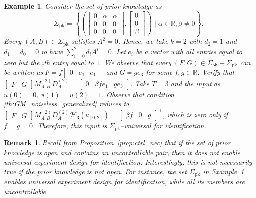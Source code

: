 \documentclass[journal,twoside,web]{ieeecolor}
\newcommand{\set}[2]{\left\{#1 \mid #2\right\}}
\newtheorem{example}[theorem]{Example}
\newtheorem{remark}[theorem]{Remark}
\begin{document}
\begin{example}
\label{ex:3}
Consider the set of prior knowledge as
\begin{equation}
\Sigma_\text{pk}=\set{\left(\begin{bmatrix}
0 & \alpha & \alpha \\
0 & 0        & 0 \\
0 & 0        & 0
\end{bmatrix},\begin{bmatrix}
0 \\ 0 \\ \beta
\end{bmatrix}\right)}{\alpha\in\mathbb{R},\beta\neq 0}.
\end{equation}
Every $(A,B)\in\Sigma_\text{pk}$ satisfies $A^2=0$. Hence, we take $k=2$ with $d_2=1$ and $d_1=d_0=0$ to have $\sum_{i=0}^2 d_iA^i=0$. Let $e_{i}$ be a vector with all entries equal to zero but the $i$th entry equal to $1$. We observe that every \mbox{$(F,G)\in\Sigma_\text{pk}-\Sigma_\text{pk}$} can be written as \mbox{$F=f\begin{bmatrix}
0 \!&\! e_1 \!&\! e_1
\end{bmatrix}$} and $G=ge_3$
for some $f,g\in\mathbb{R}$. Verify that \mbox{$\begin{bmatrix}
F \!\!&\!\! G
\end{bmatrix}M_{A,B}^{(2)}D_A^{(2)}=\begin{bmatrix}
0 \!&\! \beta fe_1 \!&\! ge_3
\end{bmatrix}$}. Take \mbox{$T=3$} and the input as $u(0)=0$, \mbox{$u(1)=u(2)=1$}. Observe that condition \eqref{th:GM_noiseless_generalized} reduces to \mbox{$\begin{bmatrix}
F & G
\end{bmatrix}M_{A,B}^{(2)}D_A^{(2)}\mathcal{H}_{3}(u_{[0,2]})=\begin{bmatrix}
\beta f & 0 & g
\end{bmatrix}^\top$}, which is zero only if $f=g=0$. Therefore, this input is \mbox{$\Sigma_\text{pk}$--universal} for identification.
\end{example}

\begin{remark}
\label{rem:uncont}
Recall from Proposition~\ref{prop:ctrl_nec} that if the set of prior knowledge is open and contains an uncontrollable pair, then it does not enable universal experiment design for identification. Interestingly, this is not necessarily true if the prior knowledge is not open. For instance, the set $\Sigma_\text{pk}$ in Example~\ref{ex:3} enables universal experiment design for identification, while all its members are uncontrollable. 
\end{remark}
\end{document}
